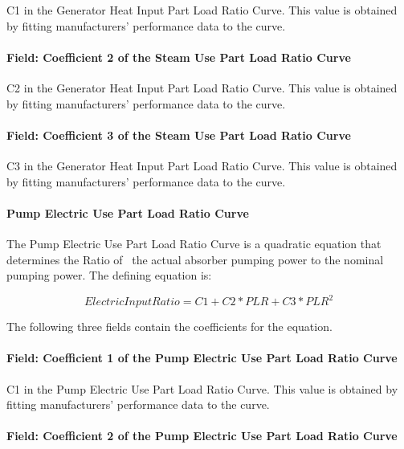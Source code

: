 C1 in the Generator Heat Input Part Load Ratio Curve. This value is obtained by fitting manufacturers' performance data to the curve.

\paragraph{Field: Coefficient 2 of the Steam Use Part Load Ratio Curve}\label{field-coefficient-2-of-the-steam-use-part-load-ratio-curve}

C2 in the Generator Heat Input Part Load Ratio Curve. This value is obtained by fitting manufacturers' performance data to the curve.

\paragraph{Field: Coefficient 3 of the Steam Use Part Load Ratio Curve}\label{field-coefficient-3-of-the-steam-use-part-load-ratio-curve}

C3 in the Generator Heat Input Part Load Ratio Curve. This value is obtained by fitting manufacturers' performance data to the curve.

\paragraph{Pump Electric Use Part Load Ratio Curve}\label{pump-electric-use-part-load-ratio-curve}

The Pump Electric Use Part Load Ratio Curve is a quadratic equation that determines the Ratio of~ the actual absorber pumping power to the nominal pumping power. The defining equation is:

\begin{equation}
    ElectricInputRatio = C1 + C2 * PLR + C3 * PL{R^2}
\end{equation}

The following three fields contain the coefficients for the equation.

\paragraph{Field: Coefficient 1 of the Pump Electric Use Part Load Ratio Curve}\label{field-coefficient-1-of-the-pump-electric-use-part-load-ratio-curve}

C1 in the Pump Electric Use Part Load Ratio Curve. This value is obtained by fitting manufacturers' performance data to the curve.

\paragraph{Field: Coefficient 2 of the Pump Electric Use Part Load Ratio Curve}\label{field-coefficient-2-of-the-pump-electric-use-part-load-ratio-curve}

